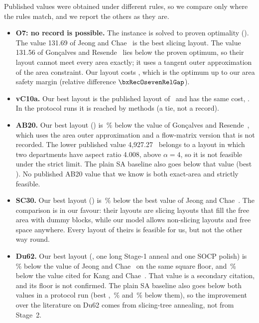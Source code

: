 Published values were obtained under different rules, so we compare only where the rules match, and we
report the others as they are.
\begin{itemize}
\item \textbf{O7: no record is possible.} The instance is solved to proven optimality (\bxRefOsevenFull).
The value 131.69 of Jeong and Chae~\cite{jeong2026} is the best slicing layout. The value 131.56 of
Gon\c{c}alves and Resende~\cite{goncalves2015} lies below the proven optimum, so their layout cannot meet every area
exactly; it uses a tangent outer approximation of the area constraint. Our layout costs \bxRecBestOsevenSeven, which
is the optimum up to our area safety margin (relative difference $\bxRecOsevenRelGap$).
\item \textbf{vC10a.} Our best layout is the published layout of~\cite{jeong2026} and has the same cost,
\bxRecBestvCtena. In the protocol runs it is reached by \bxProtBestNtiedvCtena{} methods (a tie, not a record).
\item \textbf{AB20.} Our best layout (\bxRecBestABtwenty) is \bxDeltaABtwentyGR\,\% below the value of
Gon\c{c}alves and Resende~\cite{goncalves2015}, which uses the area outer approximation and a flow-matrix version
that is not recorded. The lower published value 4{,}927.27~\cite{jeong2026} belongs to a layout in which two
departments have aspect ratio 4.008, above $\alpha=4$, so it is not feasible under the strict limit. The plain SA
baseline also goes below that value (best \bxBestSAABtwenty). No published AB20 value that we know is both
exact-area and strictly feasible.
\item \textbf{SC30.} Our best layout (\bxRecBestSCthirty) is \bxDeltaSCthirtyJC\,\% below the best value of
Jeong and Chae~\cite{jeong2026}. The comparison is in our favour: their layouts are slicing layouts that fill the
free area with dummy blocks, while our model allows non-slicing layouts and free space anywhere. Every layout of
theirs is feasible for us, but not the other way round.
\item \textbf{Du62.} Our best layout (\bxRecBestDusixtytwo, one long Stage-1 anneal and one SOCP polish) is
\bxDeltaDusixtytwoJC\,\% below the value of Jeong and Chae~\cite{jeong2026} on the same square floor, and
\bxDeltaDusixtytwoKC\,\% below the value cited for Kang and Chae~\cite{kang2017}. That value is a secondary citation,
and its floor is not confirmed. The plain SA baseline also goes below both values in a protocol run (best
\bxBestSADusixtytwo, \bxDeltaDusixtytwoJCsa\,\% and \bxDeltaDusixtytwoKCsa\,\% below them), so the improvement over
the literature on Du62 comes from slicing-tree annealing, not from Stage~2.
\end{itemize}

